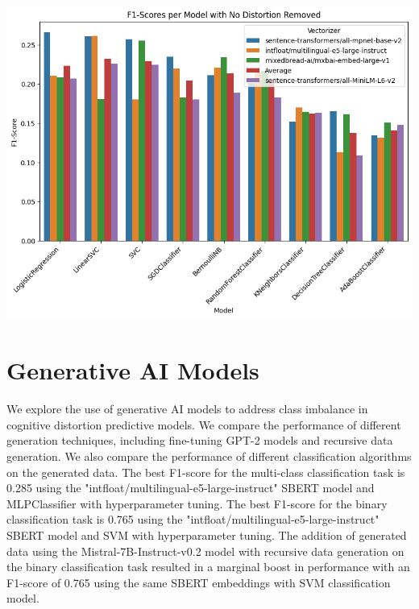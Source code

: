 \documentclass[a0,landscape]{a0poster}
\begin{document}
\begin{multicols}{4}
\begin{center}\vspace{1cm}
\includegraphics[width=0.99\linewidth]{figures/F1ScoresInitSBERT.png}
\end{center}\vspace{1cm}

\color{Black}

\color{Teal}
\section*{Generative AI Models}
\color{Black}

We explore the use of generative AI models to address class imbalance in cognitive distortion predictive models. We compare the performance of different generation 
techniques, including fine-tuning GPT-2 models and recursive data generation. We also compare the performance of different classification algorithms on the generated data. 
The best F1-score for the multi-class classification task is 0.285 using the "intfloat/multilingual-e5-large-instruct" SBERT model and MLPClassifier with hyperparameter 
tuning. The best F1-score for the binary classification task is 0.765 using the "intfloat/multilingual-e5-large-instruct" SBERT model and SVM with hyperparameter tuning. 
The addition of generated data using the Mistral-7B-Instruct-v0.2 model with recursive data generation on the binary classification task resulted in a marginal boost 
in performance with an F1-score of 0.765 using the same SBERT embeddings with SVM classification model.


\end{multicols}
\end{document}
